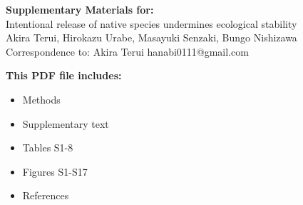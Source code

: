 \begin{center}
\LARGE{\textbf{Supplementary Materials for:}}\\[7.5mm]
\LARGE{Intentional release of native species undermines ecological stability}\\[7.5mm]
\large{Akira Terui, Hirokazu Urabe, Masayuki Senzaki, Bungo Nishizawa}\\[7.5mm]
\large{Correspondence to: Akira Terui hanabi0111@gmail.com}\\[15mm]\end{center}
\begin{flushleft}
\textbf{This PDF file includes:}
\begin{itemize}
\item Methods
\item Supplementary text
\item Tables S1-8
\item Figures S1-S17
\item References
\end{itemize}
\end{flushleft}

\newpage